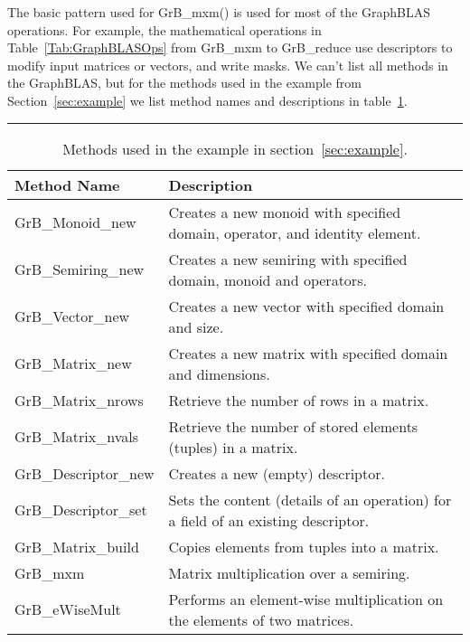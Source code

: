 The basic pattern used for {\sf GrB\_mxm()} is used for most of the GraphBLAS operations.
For example, the mathematical operations in 
Table~\ref{Tab:GraphBLASOps}  from {\sf GrB\_mxm} to {\sf GrB\_reduce}
use descriptors to modify input matrices or vectors, and write masks.  
We can't list all methods in the GraphBLAS, but for the methods used in the example from Section~\ref{sec:example}
we list method names and descriptions in table~\ref{Tab:GrBmethods}.    
 
\begin{table}[h]
\hrule
\begin{center}
\caption{Methods used in the example in section~\ref{sec:example}.}
\label{Tab:GrBmethods}
\begin{tabular}{lp{5.25cm}}
Method Name                     & Description    \\
\hline
	{\sf GrB\_Monoid\_new}      & Creates a new monoid with specified domain, operator, and identity element.    \\
	{\sf GrB\_Semiring\_new}    & Creates a new semiring with specified domain, monoid and operators.               \\
	{\sf GrB\_Vector\_new}      & Creates a new vector with specified domain and size.                                \\
	{\sf GrB\_Matrix\_new}      & Creates a new matrix with specified domain and dimensions.                          \\
	{\sf GrB\_Matrix\_nrows}    & Retrieve the number of rows in a matrix.                                            \\
	{\sf GrB\_Matrix\_nvals}    & Retrieve the number of stored elements (tuples) in a matrix.                        \\
	{\sf GrB\_Descriptor\_new}  & Creates a new (empty) descriptor.                                                  \\
	{\sf GrB\_Descriptor\_set}  & Sets the content (details of an operation) for a field of an existing descriptor.   \\
	{\sf GrB\_Matrix\_build}    & Copies elements from tuples into a matrix.                                         \\
	{\sf GrB\_mxm}              & Matrix multiplication over a semiring.                              \\
	{\sf GrB\_eWiseMult}        & Performs an element-wise multiplication on the elements of two matrices.            \\

\end{tabular}
\end{center}
\end{table}
